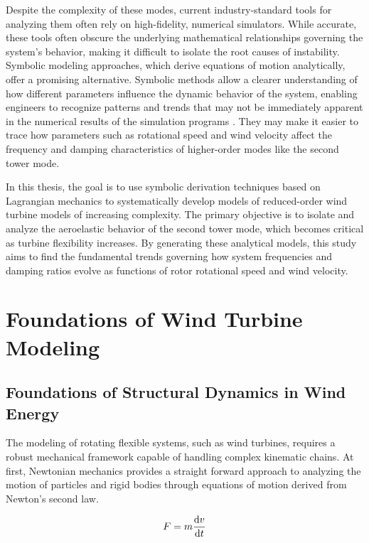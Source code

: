 \documentclass[onecolumn,draftcls]{IEEEtran}
\begin{document}
Despite the complexity of these modes, current industry-standard tools for analyzing them often rely on high-fidelity, numerical simulators. While accurate, these tools often obscure the underlying mathematical relationships governing the system's behavior, making it difficult to isolate the root causes of instability. Symbolic modeling approaches, which derive equations of motion analytically, offer a promising alternative. Symbolic methods allow a clearer understanding of how different parameters influence the dynamic behavior of the system, enabling engineers to recognize patterns and trends that may not be immediately apparent in the numerical results of the simulation programs \cite{branlard2022symbolic}. They may make it easier to trace how parameters such as rotational speed and wind velocity affect the frequency and damping characteristics of higher-order modes like the second tower mode.

In this thesis, the goal is to use symbolic derivation techniques based on Lagrangian mechanics to systematically develop models of reduced-order wind turbine models of increasing complexity. The primary objective is to isolate and analyze the aeroelastic behavior of the second tower mode, which becomes critical as turbine flexibility increases. By generating these analytical models, this study aims to find the fundamental trends governing how system frequencies and damping ratios evolve as functions of rotor rotational speed and wind velocity.


\newpage

\section{Foundations of Wind Turbine Modeling}
\subsection*{Foundations of Structural Dynamics in Wind Energy}
The modeling of rotating flexible systems, such as wind turbines, requires a robust mechanical framework capable of handling complex kinematic chains.
At first, Newtonian mechanics provides a straight forward approach to analyzing the motion of particles and rigid bodies through equations of motion derived from Newton's second law.

\begin{equation}
    \label{eq:newton}
    F = m\derivative{v}{t}
\end{equation}
\end{document}
